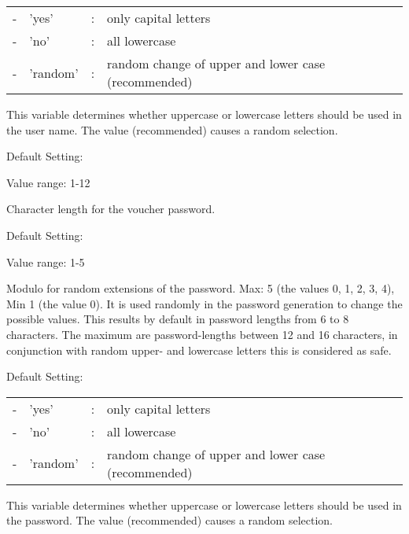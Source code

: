 \begin{description}
  \begin{tabular}{rlrl}
   -&'yes'&:&only capital letters \\
   -&'no'&:&all lowercase\\
   -&'random'&:&random change of upper and lower case (recommended)\\
  \end{tabular}

  This variable determines whether uppercase or lowercase letters should be used in the user name.
  The value  (recommended) causes a random selection.


  Default Setting: 

  Value range: 1-12

  Character length for the voucher password.


  Default Setting: 

  Value range: 1-5

  Modulo for random extensions of the password. Max: 5 (the values 0, 1, 2, 3, 4),
  Min 1 (the value 0). It is used randomly in the password generation to change the
  possible values. This results by default in password lengths from 6 to 8 characters.
  The maximum are password-lengths between 12 and 16 characters, in conjunction with
  random upper- and lowercase letters this is considered as safe.


   Default Setting: 

  \begin{tabular}{rlrl}
   -&'yes'&:&only capital letters \\
   -&'no'&:&all lowercase\\
   -&'random'&:&random change of upper and lower case (recommended)\\
  \end{tabular}

  This variable determines whether uppercase or lowercase letters should be used in the password.
  The value  (recommended) causes a random selection.

\end{description}
